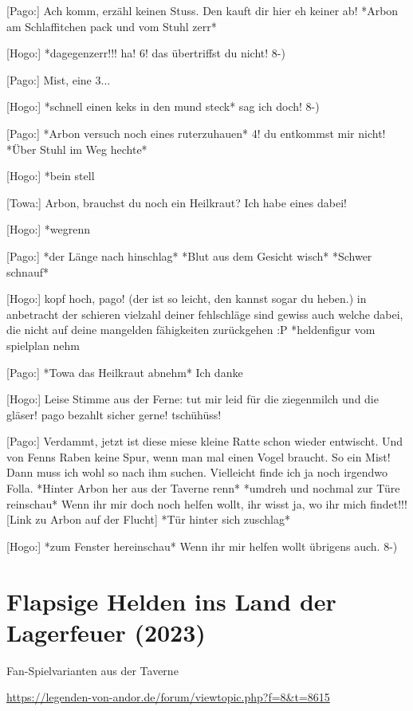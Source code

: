 {[Pago:] Ach komm, erzähl keinen Stuss. Den kauft dir hier eh keiner ab! *Arbon am Schlaffitchen pack und vom Stuhl zerr*

[Hogo:] *dagegenzerr!!! ha! 6! das übertriffst du nicht! 8-)

[Pago:] Mist, eine 3...

[Hogo:] *schnell einen keks in den mund steck* sag ich doch! 8-)

[Pago:] *Arbon versuch noch eines ruterzuhauen* 4! du entkommst mir nicht! *Über Stuhl im Weg hechte*

[Hogo:] *bein stell

[Towa:] Arbon, brauchst du noch ein Heilkraut? Ich habe eines dabei!

[Hogo:] *wegrenn

[Pago:] *der Länge nach hinschlag* *Blut aus dem Gesicht wisch* *Schwer schnauf*

[Hogo:] kopf hoch, pago! (der ist so leicht, den kannst sogar du heben.) in anbetracht der schieren vielzahl deiner fehlschläge sind gewiss auch welche dabei, die nicht auf deine mangelden fähigkeiten zurückgehen :P *heldenfigur vom spielplan nehm

[Pago:] *Towa das Heilkraut abnehm* Ich danke

[Hogo:] Leise Stimme aus der Ferne: tut mir leid für die ziegenmilch und die gläser! pago bezahlt sicher gerne! tschühüss!

[Pago:] Verdammt, jetzt ist diese miese kleine Ratte schon wieder entwischt. Und von Fenns Raben keine Spur, wenn man mal einen Vogel braucht. So ein Mist! Dann muss ich wohl so nach ihm suchen. Vielleicht finde ich ja noch irgendwo Folla. *Hinter Arbon her aus der Taverne renn*
*umdreh und nochmal zur Türe reinschau* Wenn ihr mir doch noch helfen wollt, ihr wisst ja, wo ihr mich findet!!! [Link zu Arbon auf der Flucht] *Tür hinter sich zuschlag*

[Hogo:] *zum Fenster hereinschau* Wenn ihr mir helfen wollt übrigens auch. 8-)


\newpage
{}
\section{Flapsige Helden ins Land der Lagerfeuer (2023)}

\begin{center}
    Fan-Spielvarianten aus der Taverne

    \url{https://legenden-von-andor.de/forum/viewtopic.php?f=8&t=8615}
\end{center}

}
